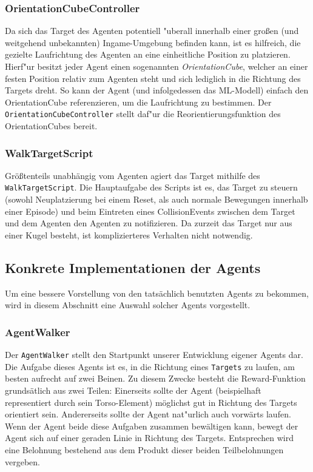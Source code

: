 \subsubsection{OrientationCubeController}

Da sich das Target des Agenten potentiell "uberall innerhalb einer großen (und weitgehend unbekannten) Ingame-Umgebung befinden kann, ist es hilfreich, die gezielte Laufrichtung des Agenten an eine einheitliche Position zu platzieren. Hierf"ur besitzt jeder Agent einen sogenannten \textit{OrientationCube}, welcher an einer festen Position relativ zum Agenten steht und sich lediglich in die Richtung des Targets dreht. So kann der Agent (und infolgedessen das ML-Modell) einfach den OrientationCube referenzieren, um die Laufrichtung zu bestimmen. Der \texttt{OrientationCubeController} stellt daf"ur die Reorientierungsfunktion des OrientationCubes bereit.


\subsubsection{WalkTargetScript}

Größtenteils unabhängig vom Agenten agiert das Target mithilfe des \texttt{WalkTargetScript}. Die Hauptaufgabe des Scripts ist es, das Target zu steuern (sowohl Neuplatzierung bei einem Reset, als auch normale Bewegungen innerhalb einer Episode) und beim Eintreten eines CollisionEvents zwischen dem Target und dem Agenten den Agenten zu notifizieren. Da zurzeit das Target nur aus einer Kugel besteht, ist komplizierteres Verhalten nicht notwendig.

\subsection{Konkrete Implementationen der Agents}
\label{sec:konkretAgents}

Um eine bessere Vorstellung von den tatsächlich benutzten Agents zu bekommen, wird in diesem Abschnitt eine Auswahl solcher Agents vorgestellt. 

\subsubsection{AgentWalker}

Der \texttt{AgentWalker} stellt den Startpunkt unserer Entwicklung eigener Agents dar. Die Aufgabe dieses Agents ist es, in die Richtung eines \texttt{Targets} zu laufen, am besten aufrecht auf zwei Beinen. Zu diesem Zwecke besteht die Reward-Funktion grundsätlich aus zwei Teilen: Einerseits sollte der Agent (beispielhaft representiert durch sein Torso-Element) möglichst gut in Richtung des Targets orientiert sein. Andererseits sollte der Agent nat"urlich auch vorwärts laufen. Wenn der Agent beide diese Aufgaben zusammen bewältigen kann, bewegt der Agent sich auf einer geraden Linie in Richtung des Targets. Entsprechen wird eine Belohnung bestehend aus dem Produkt dieser beiden Teilbelohnungen vergeben.

